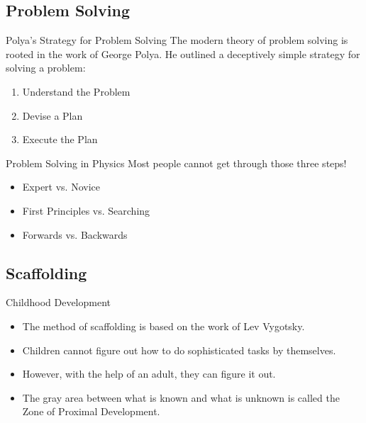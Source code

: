 \documentclass{beamer}
\begin{document}
\subsection*{Problem Solving}

\begin{frame}{Polya's Strategy for Problem Solving}
The modern theory of problem solving is rooted in the work of George Polya. He outlined a deceptively simple strategy for solving a problem:
\vspace{5mm}
\begin{enumerate}
\item Understand the Problem
\item Devise a Plan
\item Execute the Plan
\end{enumerate}
\end{frame}

\begin{frame}{Problem Solving in Physics}
Most people cannot get through those three steps!
\vspace{5mm}
\begin{itemize}
\item Expert vs. Novice
\item First Principles vs. Searching
\item Forwards vs. Backwards
\end{itemize}
\end{frame}

\subsection*{Scaffolding}

\begin{frame}{Childhood Development}
\begin{itemize}
\item The method of scaffolding is based on the work of Lev Vygotsky.
\item Children cannot figure out how to do sophisticated tasks by themselves.
\item However, with the help of an adult, they can figure it out.
\item The gray area between what is known and what is unknown is called the Zone of Proximal Development.
\end{itemize}
\end{frame}
\end{document}
